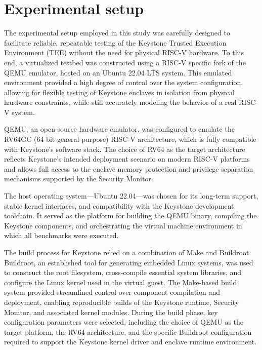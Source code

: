 \section{Experimental setup}

The experimental setup employed in this study was carefully designed to facilitate reliable, repeatable testing of the Keystone Trusted Execution Environment (TEE) without the need for physical RISC-V hardware. To this end, a virtualized testbed was constructed using a RISC-V specific fork of the QEMU emulator, hosted on an Ubuntu 22.04 LTS system. This emulated environment provided a high degree of control over the system configuration, allowing for flexible testing of Keystone enclaves in isolation from physical hardware constraints, while still accurately modeling the behavior of a real RISC-V system.

QEMU, an open-source hardware emulator, was configured to emulate the RV64GC (64-bit general-purpose) RISC-V architecture, which is fully compatible with Keystone’s software stack. The choice of RV64 as the target architecture reflects Keystone’s intended deployment scenario on modern RISC-V platforms and allows full access to the enclave memory protection and privilege separation mechanisms supported by the Security Monitor.

The host operating system—Ubuntu 22.04—was chosen for its long-term support, stable kernel interfaces, and compatibility with the Keystone development toolchain. It served as the platform for building the QEMU binary, compiling the Keystone components, and orchestrating the virtual machine environment in which all benchmarks were executed.

The build process for Keystone relied on a combination of Make and Buildroot. Buildroot, an established tool for generating embedded Linux systems, was used to construct the root filesystem, cross-compile essential system libraries, and configure the Linux kernel used in the virtual guest. The Make-based build system provided streamlined control over component compilation and deployment, enabling reproducible builds of the Keystone runtime, Security Monitor, and associated kernel modules. During the build phase, key configuration parameters were selected, including the choice of QEMU as the target platform, the RV64 architecture, and the specific Buildroot configuration required to support the Keystone kernel driver and enclave runtime environment.

